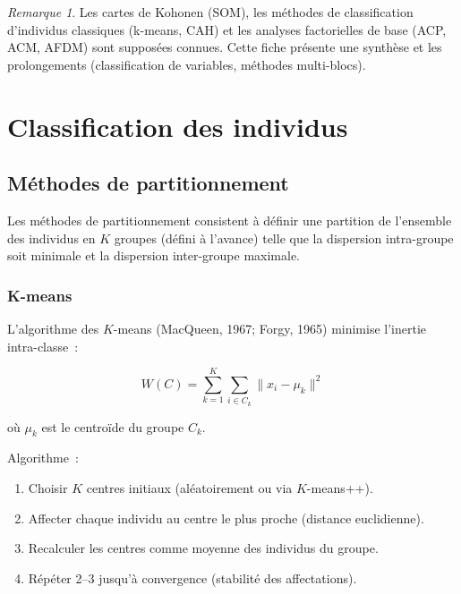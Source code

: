\documentclass[a4paper,11pt]{article}
\theoremstyle{definition}
\theoremstyle{remark}
\newtheorem*{remark}{Remarque}
\begin{document}
\begin{remark}
  Les cartes de Kohonen (SOM), les m\'ethodes de classification
  d'individus classiques (k-means, CAH) et les analyses factorielles
  de base (ACP, ACM, AFDM) sont suppos\'ees connues. Cette fiche
  pr\'esente une synth\`ese et les prolongements (classification de
  variables, m\'ethodes multi-blocs).
\end{remark}

\section{Classification des individus}

\subsection{M\'ethodes de partitionnement}

Les m\'ethodes de partitionnement consistent \`a d\'efinir une partition
de l'ensemble des individus en $K$ groupes (d\'efini \`a l'avance)
telle que la dispersion intra-groupe soit minimale et la dispersion
inter-groupe maximale.

\subsubsection{K-means}

L'algorithme des $K$-means (MacQueen, 1967; Forgy, 1965) minimise
l'inertie intra-classe~:

\begin{equation}
W(C) = \sum_{k=1}^{K} \sum_{i \in C_k} \| x_i - \mu_k \|^2
\end{equation}

o\`u $\mu_k$ est le centro\"ide du groupe $C_k$.

Algorithme~:
\begin{enumerate}
  \item Choisir $K$ centres initiaux (al\'eatoirement ou via
    $K$-means++).
  \item Affecter chaque individu au centre le plus proche (distance
    euclidienne).
  \item Recalculer les centres comme moyenne des individus du groupe.
  \item R\'ep\'eter 2--3 jusqu'\`a convergence (stabilit\'e des
    affectations).
\end{enumerate}
\end{document}
